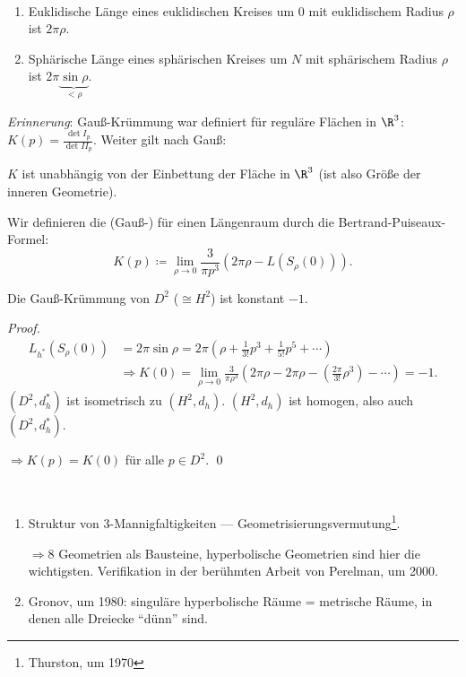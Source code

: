 \begin{remark}
  \
  \begin{enumerate}
    \item Euklidische Länge eines euklidischen Kreises um \( 0 \) mit euklidischem Radius \( \rho \) ist \( 2\pi\rho \).
    \item Sphärische Länge eines sphärischen Kreises um \( N \) mit sphärischem Radius \( \rho \) ist \( 2\pi\underbrace{\sin \rho}_{< \rho} \).
  \end{enumerate}
  \emph{Erinnerung}: Gauß-Krümmung war definiert für reguläre Flächen in \( \R^3 \): \( K(p) = \frac{\det I_p}{\det II_p} \). Weiter gilt nach Gauß:

  \( K \) ist unabhängig von der Einbettung der Fläche in \( \R^3 \) (ist also Größe der inneren Geometrie).
\end{remark}

\begin{definition}[Krümmung]
  Wir definieren die (Gauß-) für einen Längenraum durch die Bertrand-Puiseaux-Formel:
  \begin{equation*}
    K(p) \coloneqq \lim_{\rho \to 0} \frac{3}{\pi p^3}\left( 2\pi\rho - L\left( S_\rho(0) \right) \right)\text{.}
  \end{equation*}
\end{definition}

\begin{theorem}
  Die Gauß-Krümmung von \( D^2 \) (\( \cong H^2 \)) ist konstant \( -1 \).

  \begin{proof}
    \
    \begin{align*}
      L_{h^\ast}(S_\rho(0)) &= 2\pi\sin\rho = 2\pi\left( \rho + \frac{1}{3!}p^3 + \frac{1}{5!}p^5 + \cdots \right) \\
       &\Rightarrow K(0) = \lim_{\rho \to 0} \frac{3}{\pi \rho^3}\left( 2\pi\rho - 2\pi\rho - \left( \frac{2\pi}{3!}\rho^3 \right) - \cdots \right) = -1\text{.}
    \end{align*}
    \( (D^2, d_h^\ast) \) ist isometrisch zu \( (H^2, d_h) \). \( (H^2, d_h) \) ist homogen, also auch \( (D^2, d_h^\ast) \).

    \( \Rightarrow K(p) = K(0) \) für alle \( p \in D^2 \). \qed
  \end{proof}
\end{theorem}

\begin{remark}
  \
  \begin{enumerate}
    \item Struktur von \( 3 \)-Mannigfaltigkeiten --- Geometrisierungsvermutung\footnote{Thurston, um 1970}.

      \( \Rightarrow 8 \) Geometrien als Bausteine, hyperbolische Geometrien sind hier die wichtigsten. Verifikation in der berühmten Arbeit von Perelman, um 2000.

    \item Gronov, um 1980: singuläre hyperbolische Räume = metrische Räume, in denen alle Dreiecke ``dünn'' sind.
  \end{enumerate}
\end{remark}